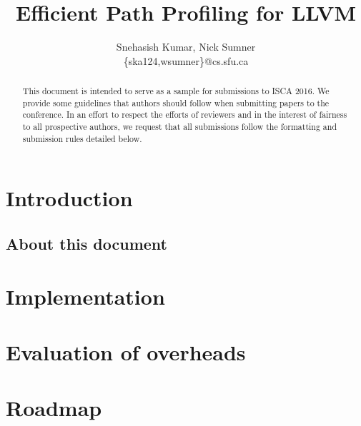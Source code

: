 \documentclass{sig-alternate}
\title{Efficient Path Profiling for LLVM}
\author{Snehasish Kumar,  Nick Sumner\\\{ska124,wsumner\}@cs.sfu.ca}
\begin{document}
\maketitle
\pagestyle{plain}
\begin{abstract}

This document is intended to serve as a sample for submissions to ISCA 2016. We provide some guidelines that authors should follow when submitting papers to the conference. In an effort to respect the efforts of reviewers and in the interest of fairness to all prospective authors, we request that all submissions follow the formatting and submission rules detailed below. 

\end{abstract}

\section{Introduction}

\subsection{About this document}

\section{Implementation}

\section{Evaluation of overheads}

\section{Roadmap}



\end{document}
